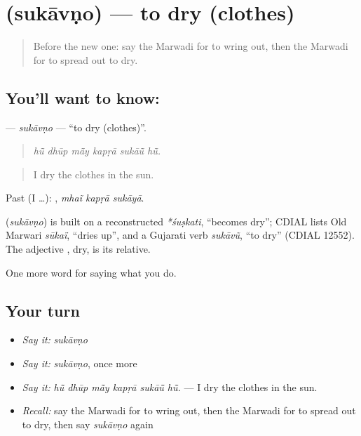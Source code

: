 \section[\texorpdfstring{\mw{सुकावणो} (sukāvṇo)}{सुकावणो (sukāvṇo)}]{ (sukāvṇo) — to dry (clothes)}

\label{lesson:MW-C170-sukavno}



\begin{quote}
Before the new one: say the Marwadi for to wring out, then the Marwadi for to spread out to dry.
\end{quote}

\subsection*{You'll want to know: }
\textbf{} — \emph{sukāvṇo} — \textquotedblleft{}to dry (clothes)\textquotedblright{}.

\begin{quote}
     
\end{quote}

\begin{quote}
\emph{hū̃ dhūp mā̃y kapṛā sukāū̃ hū̃.}
\end{quote}

\begin{quote}
I dry the clothes in the sun.
\end{quote}

Past (I …):   , \emph{mhaĩ kapṛā sukāyā}.

\begin{cousinweb}
\textbf{} (\emph{sukāvṇo}) is built on a reconstructed \emph{*śuṣkati}, \textquotedblleft{}becomes dry\textquotedblright{}; CDIAL lists Old Marwari \emph{sūkaï}, \textquotedblleft{}dries up\textquotedblright{}, and a Gujarati verb \emph{sukāvũ}, \textquotedblleft{}to dry\textquotedblright{} (CDIAL 12552). The adjective \textbf{}, dry, is its relative.
\end{cousinweb}

\begin{grammarlens}[title={What you've built}]
One more word for saying what you do.
\end{grammarlens}

\subsection*{Your turn}
\begin{itemize}
\raggedright
  \item \emph{Say it:} \emph{sukāvṇo}
  \item \emph{Say it:} \emph{sukāvṇo}, once more
  \item \emph{Say it:} \emph{hū̃ dhūp mā̃y kapṛā sukāū̃ hū̃.} — I dry the clothes in the sun.
  \item \emph{Recall:} say the Marwadi for to wring out, then the Marwadi for to spread out to dry, then say \emph{sukāvṇo} again
\end{itemize}

